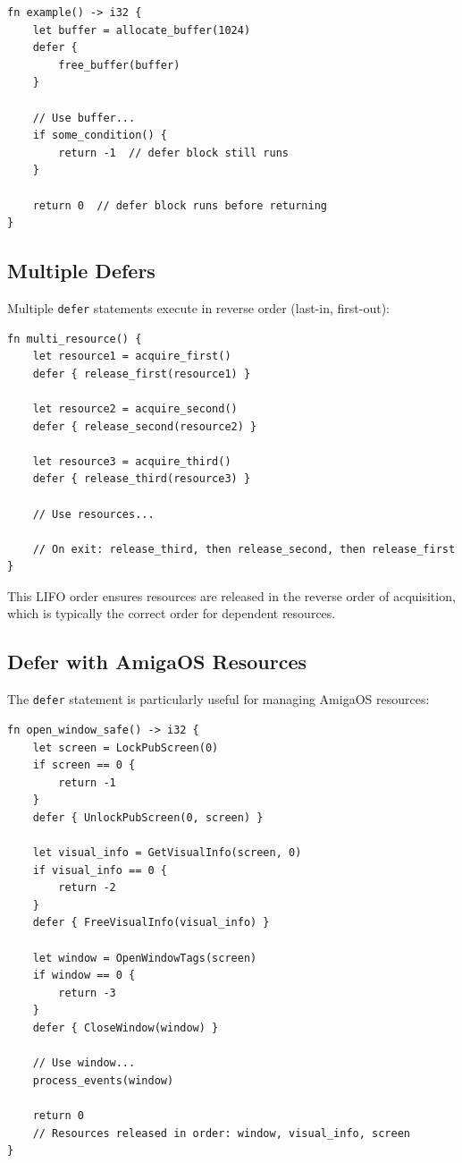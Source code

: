 \begin{lstlisting}
fn example() -> i32 {
    let buffer = allocate_buffer(1024)
    defer {
        free_buffer(buffer)
    }

    // Use buffer...
    if some_condition() {
        return -1  // defer block still runs
    }

    return 0  // defer block runs before returning
}
\end{lstlisting}

\subsection{Multiple Defers}
\label{subsec:defer-multiple}

Multiple \texttt{defer} statements execute in reverse order (last-in, first-out):

\begin{lstlisting}
fn multi_resource() {
    let resource1 = acquire_first()
    defer { release_first(resource1) }

    let resource2 = acquire_second()
    defer { release_second(resource2) }

    let resource3 = acquire_third()
    defer { release_third(resource3) }

    // Use resources...

    // On exit: release_third, then release_second, then release_first
}
\end{lstlisting}

This LIFO order ensures resources are released in the reverse order of acquisition, which is typically the correct order for dependent resources.

\subsection{Defer with AmigaOS Resources}
\label{subsec:defer-amiga}

The \texttt{defer} statement is particularly useful for managing AmigaOS resources:

\begin{lstlisting}
fn open_window_safe() -> i32 {
    let screen = LockPubScreen(0)
    if screen == 0 {
        return -1
    }
    defer { UnlockPubScreen(0, screen) }

    let visual_info = GetVisualInfo(screen, 0)
    if visual_info == 0 {
        return -2
    }
    defer { FreeVisualInfo(visual_info) }

    let window = OpenWindowTags(screen)
    if window == 0 {
        return -3
    }
    defer { CloseWindow(window) }

    // Use window...
    process_events(window)

    return 0
    // Resources released in order: window, visual_info, screen
}
\end{lstlisting}


